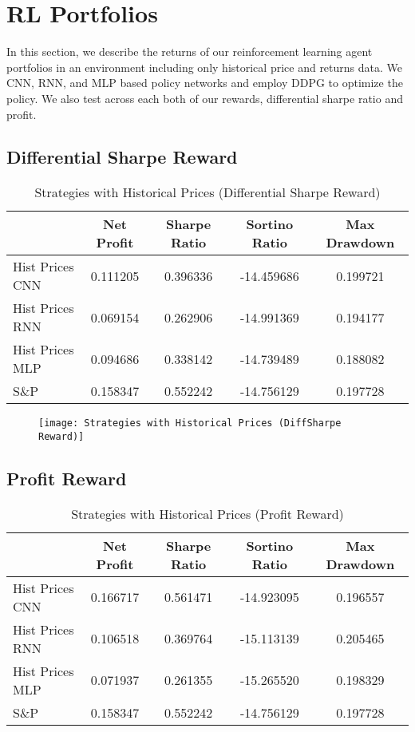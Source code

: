 \section{RL Portfolios}
In this section, we describe the returns of our reinforcement learning agent portfolios in an environment including only historical price and returns data. We CNN, RNN, and MLP based policy networks and employ DDPG to optimize the policy.
We also test across each both of our rewards, differential sharpe ratio and profit.

\subsection{Differential Sharpe Reward}
\begin{table}[htbp]
    \centering
    \caption{Strategies with Historical Prices (Differential Sharpe Reward)}
      \begin{tabular}{lcccc}
      \toprule
            & Net Profit & Sharpe Ratio & Sortino Ratio & Max Drawdown \\
      \midrule
      Hist Prices CNN & 0.111205 & 0.396336 & -14.459686 & 0.199721 \\
      Hist Prices RNN & 0.069154 & 0.262906 & -14.991369 & 0.194177 \\
      Hist Prices MLP & 0.094686 & 0.338142 & -14.739489 & 0.188082 \\
      S\&P   & 0.158347 & 0.552242 & -14.756129 & 0.197728 \\
      \bottomrule
      \end{tabular}%
    \label{tab:addlabel}%
  \end{table}%

  \begin{center}
    \begin{figure}
    \texttt{[image: Strategies with Historical Prices (DiffSharpe Reward)]}
    \end{figure}
    \end{center}

    \subsection{Profit Reward}

    \begin{table}[htbp]
        \centering
        \caption{Strategies with Historical Prices (Profit Reward)}
          \begin{tabular}{lcccc}
          \toprule
                & Net Profit & Sharpe Ratio & Sortino Ratio & Max Drawdown \\
          \midrule
          Hist Prices CNN & 0.166717 & 0.561471 & -14.923095 & 0.196557 \\
          Hist Prices RNN & 0.106518 & 0.369764 & -15.113139 & 0.205465 \\
          Hist Prices MLP & 0.071937 & 0.261355 & -15.265520 & 0.198329 \\
          S\&P   & 0.158347 & 0.552242 & -14.756129 & 0.197728 \\
          \bottomrule
          \end{tabular}%
        \label{tab:addlabel}%
      \end{table}%

